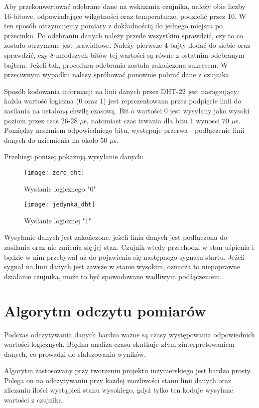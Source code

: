 Aby przekonwertować odebrane dane na wskazania czujnika, należy obie liczby 16-bitowe, odpowiadające wilgotności oraz temperaturze, podzielić przez 10. W ten sposób otrzymujemy pomiary z dokładnością do jednego miejsca po przecinku. Po odebraniu danych należy przede wszystkim sprawdzić, czy to co zostało otrzymane jest prawidłowe. Należy pierwsze 4 bajty dodać do siebie oraz sprawdzić, czy 8 młodszych bitów tej wartości są równe z ostatnim odebranym bajtem. Jeżeli tak, procedura odebrania została zakończona sukcesem. W przeciwnym wypadku należy spróbować ponownie pobrać dane z czujnika.

Sposób kodowania informacji na linii danych przez DHT-22 jest następujący: każda wartość logiczna (0 oraz 1) jest reprezentowana przez podpięcie linii do zasilania na ustaloną chwilę czasową. Bit o wartości 0 jest wysyłany jako wysoki poziom przez czas 26-28 $\mu$s, natomiast czas trwania dla bitu 1 wynosci 70 $\mu$s. Pomiędzy nadaniem odpowiedniego bitu, występuje przerwa - podłączenie linii danych do uziemienia na około 50 $\mu$s.

Przebiegi poniżej pokazują wysyłanie danych:
\begin{figure}[h]
\centering
\texttt{[image: zero\_dht]}
\caption{Wysłanie logicznego "0"}
\label{fig:zero_dht}
\end{figure}

\begin{figure}[h]
\centering
\texttt{[image: jedynka\_dht]}
\caption{Wysłanie logicznej "1"}
\label{fig:jedynka_dht}
\end{figure}

Wysyłanie danych jest zakończone, jeżeli linia danych jest podłączona do zasilania oraz nie zmienia się jej stan. Czujnik wtedy przechodzi w stan uśpienia i będzie w nim przebywał aż do pojawienia się następnego sygnału startu. Jeżeli sygnał na linii danych jest zawsze w stanie wysokim, oznacza to niepoprawne działanie czujnika, może to być spowodowane wadliwym podłączeniem. 

\section*{Algorytm odczytu pomiarów}
Podczas odczytywania danych bardzo ważne są czasy występowania odpowiednich wartości logicznych. Błędna analiza czasu skutkuje złym zinterpretowaniem danych, co prowadzi do sfałszowania wyników.

Algorytm zastosowany przy tworzeniu projektu inżynierskiego jest bardzo prosty. Polega on na odczytywaniu przy każdej możliwości stanu linii danych oraz zliczaniu ilości wystąpień stanu wysokiego, gdyż tylko ten koduje wysyłane wartości z czujnika.

